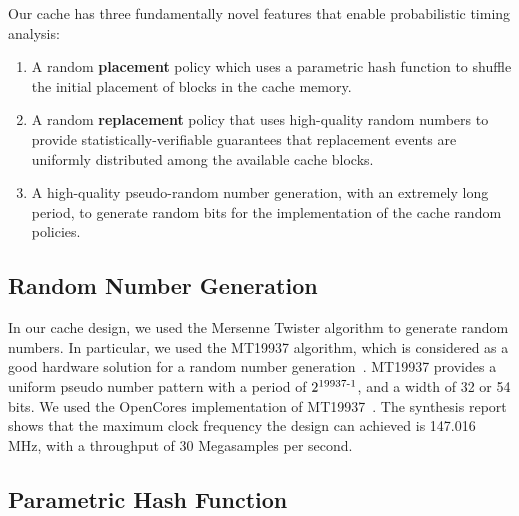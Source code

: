 Our cache has three fundamentally novel features that enable probabilistic
timing analysis:
\begin{enumerate}
\item A random \textbf{placement} policy which uses a parametric hash
  function to shuffle the initial placement of blocks in the cache memory.
\item A random \textbf{replacement} policy that uses high-quality random
numbers to provide statistically-verifiable guarantees that replacement
events are uniformly distributed among the available cache blocks.
\item A high-quality pseudo-random number generation, with an extremely
long period, to generate random bits for the implementation of the cache
random policies.
\end{enumerate}
%
%
\subsection{Random Number Generation}

In our cache design, we used the Mersenne Twister algorithm to
generate random numbers. In particular, we used the MT19937 algorithm,
which is considered as a good hardware solution for a random number
generation~\cite{Matsumoto:1998:MTE:272991.272995}. MT19937 provides a
uniform pseudo number pattern with a period of
$2\textsuperscript{19937-1}$, and a width of 32 or 54 bits.  We used
the OpenCores implementation of MT19937~\cite{OpenCores}. The
synthesis report shows that the maximum clock frequency the design can
achieved is 147.016 MHz, with a throughput of 30 Megasamples per second.

\subsection{Parametric Hash Function}
\label{PHF}


